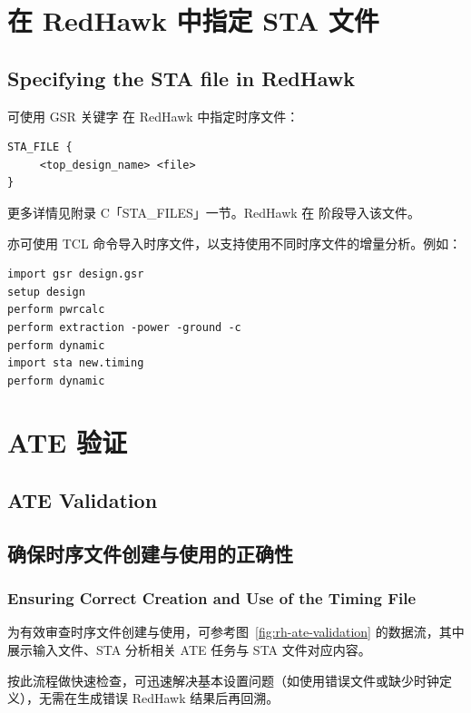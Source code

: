 \label{fig:rh-ate-perf}

\section{在 RedHawk 中指定 STA 文件}
\subsection*{Specifying the STA file in RedHawk}

可使用 GSR 关键字  在 RedHawk 中指定时序文件：
\begin{lstlisting}
STA_FILE {
     <top_design_name> <file>
}
\end{lstlisting}
更多详情见附录 C「STA\_FILES」一节。RedHawk 在  阶段导入该文件。

亦可使用  TCL 命令导入时序文件，以支持使用不同时序文件的增量分析。例如：
\begin{lstlisting}
import gsr design.gsr
setup design
perform pwrcalc
perform extraction -power -ground -c
perform dynamic
import sta new.timing
perform dynamic
\end{lstlisting}

\section{ATE 验证}
\subsection*{ATE Validation}

\subsection{确保时序文件创建与使用的正确性}
\subsubsection*{Ensuring Correct Creation and Use of the Timing File}

为有效审查时序文件创建与使用，可参考图~\ref{fig:rh-ate-validation} 的数据流，其中展示输入文件、STA 分析相关 ATE 任务与 STA 文件对应内容。

\label{fig:rh-ate-validation}

按此流程做快速检查，可迅速解决基本设置问题（如使用错误文件或缺少时钟定义），无需在生成错误 RedHawk 结果后再回溯。

